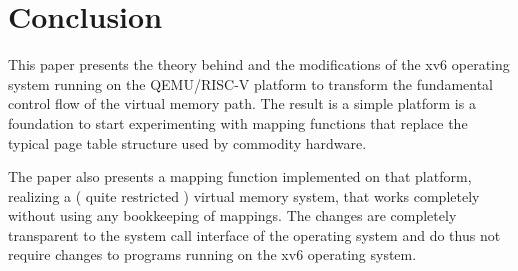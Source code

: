 \chapter{Conclusion}

\label{chap:conclusion}

\cite{choudhuri2005software} %


This paper presents the theory behind and the modifications of the xv6 operating system running on the QEMU/RISC-V platform to transform the fundamental control flow of the virtual memory path. The result is a simple platform is a foundation to start experimenting with mapping functions that replace the typical page table structure used by commodity hardware.

The paper also presents a mapping function implemented on that platform, realizing a ( quite restricted ) virtual memory system, that works completely without using any bookkeeping of mappings. The changes are completely transparent to the system call interface of the operating system and do thus not require changes to programs running on the xv6 operating system.
